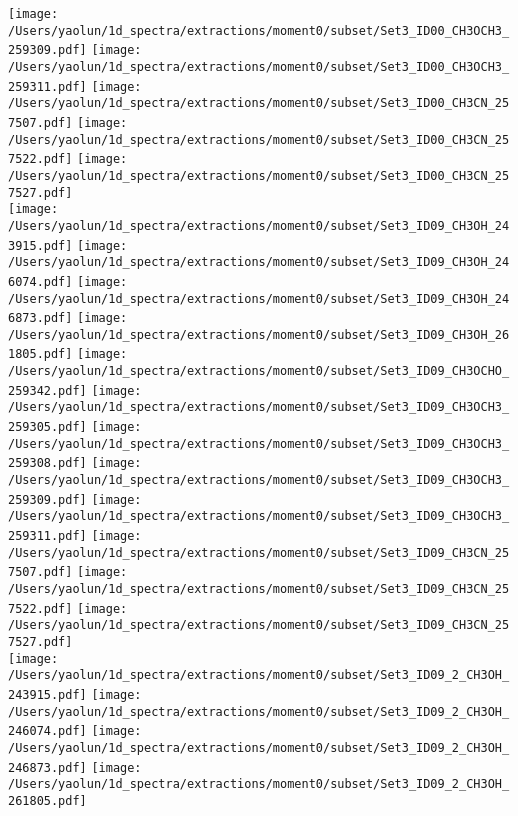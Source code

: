 \begin{figure*}[htbp!]
  \texttt{[image: /Users/yaolun/1d\_spectra/extractions/moment0/subset/Set3\_ID00\_CH3OCH3\_259309.pdf]}
  \texttt{[image: /Users/yaolun/1d\_spectra/extractions/moment0/subset/Set3\_ID00\_CH3OCH3\_259311.pdf]}
  \texttt{[image: /Users/yaolun/1d\_spectra/extractions/moment0/subset/Set3\_ID00\_CH3CN\_257507.pdf]}
  \texttt{[image: /Users/yaolun/1d\_spectra/extractions/moment0/subset/Set3\_ID00\_CH3CN\_257522.pdf]}
  \texttt{[image: /Users/yaolun/1d\_spectra/extractions/moment0/subset/Set3\_ID00\_CH3CN\_257527.pdf]}
  \\
  \texttt{[image: /Users/yaolun/1d\_spectra/extractions/moment0/subset/Set3\_ID09\_CH3OH\_243915.pdf]}
  \texttt{[image: /Users/yaolun/1d\_spectra/extractions/moment0/subset/Set3\_ID09\_CH3OH\_246074.pdf]}
  \texttt{[image: /Users/yaolun/1d\_spectra/extractions/moment0/subset/Set3\_ID09\_CH3OH\_246873.pdf]}
  \texttt{[image: /Users/yaolun/1d\_spectra/extractions/moment0/subset/Set3\_ID09\_CH3OH\_261805.pdf]}
  \texttt{[image: /Users/yaolun/1d\_spectra/extractions/moment0/subset/Set3\_ID09\_CH3OCHO\_259342.pdf]}
  \texttt{[image: /Users/yaolun/1d\_spectra/extractions/moment0/subset/Set3\_ID09\_CH3OCH3\_259305.pdf]}
  \texttt{[image: /Users/yaolun/1d\_spectra/extractions/moment0/subset/Set3\_ID09\_CH3OCH3\_259308.pdf]}
  \texttt{[image: /Users/yaolun/1d\_spectra/extractions/moment0/subset/Set3\_ID09\_CH3OCH3\_259309.pdf]}
  \texttt{[image: /Users/yaolun/1d\_spectra/extractions/moment0/subset/Set3\_ID09\_CH3OCH3\_259311.pdf]}
  \texttt{[image: /Users/yaolun/1d\_spectra/extractions/moment0/subset/Set3\_ID09\_CH3CN\_257507.pdf]}
  \texttt{[image: /Users/yaolun/1d\_spectra/extractions/moment0/subset/Set3\_ID09\_CH3CN\_257522.pdf]}
  \texttt{[image: /Users/yaolun/1d\_spectra/extractions/moment0/subset/Set3\_ID09\_CH3CN\_257527.pdf]}
  \\
  \texttt{[image: /Users/yaolun/1d\_spectra/extractions/moment0/subset/Set3\_ID09\_2\_CH3OH\_243915.pdf]}
  \texttt{[image: /Users/yaolun/1d\_spectra/extractions/moment0/subset/Set3\_ID09\_2\_CH3OH\_246074.pdf]}
  \texttt{[image: /Users/yaolun/1d\_spectra/extractions/moment0/subset/Set3\_ID09\_2\_CH3OH\_246873.pdf]}
  \texttt{[image: /Users/yaolun/1d\_spectra/extractions/moment0/subset/Set3\_ID09\_2\_CH3OH\_261805.pdf]}

\end{figure*}
